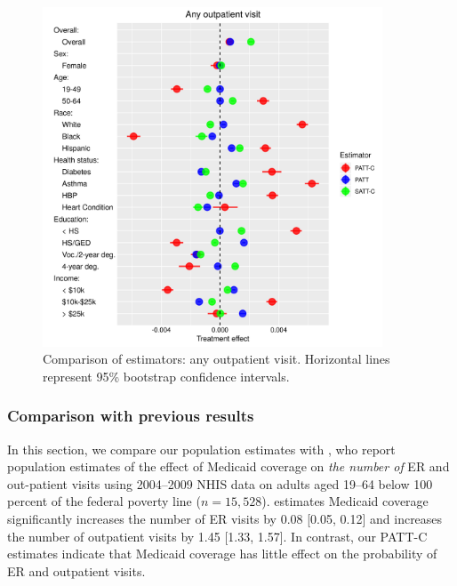 \documentclass[hidelinks,12pt]{article}
\begin{document}
{\begin{figure}[htbp]
\begin{center}
\includegraphics[width = 0.9\textwidth]{any-out-plot}
    \caption{Comparison of estimators: any outpatient visit. Horizontal lines represent 95\% bootstrap confidence intervals.\label{fig:any-out-plot}}
\end{center}
\end{figure}

{\color{red}
\subsubsection{Comparison with previous results} \label{results-compare}
}
In this section, we compare our population estimates with \citet{finkelstein2012}, who report population estimates of the effect of Medicaid coverage on \emph{the number of} ER and out-patient visits using 2004--2009 NHIS data on adults aged 19--64 below 100 percent of the federal poverty line ($n=15,528$). \citet{finkelstein2012} estimates Medicaid coverage significantly increases the number of ER visits by 0.08 [0.05, 0.12] and increases the number of outpatient visits by 1.45 [1.33, 1.57]. In contrast, our PATT-C estimates indicate that Medicaid coverage has little effect on the probability of ER and outpatient visits.

}
\end{document}
